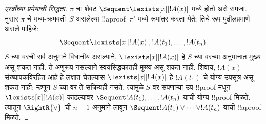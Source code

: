 \documentclass[../../../include/open-logic-section]{subfiles}
\begin{document}
\begin{proof}[एरब्राँच्या प्रमेयाची सिद्धता]
$\pi$ चा शेवट
$\Sequent \lexists[x][!A(x)]$
मध्ये होतो असे समजा.
 नुसार
$\pi$ चे मध्य-क्रमवर्ती~$S$
असलेल्या !!a{proof}~$\pi'$
मध्ये रूपांतर करता येते;
तिचे रूप पुढीलप्रमाणे असले
पाहिजे: \[\Sequent
\lexists[x][!A(x)], !A(t_1), \dots, !A(t_n).\]
$S$ च्या वरची सर्व
अनुमाने विधानीय असल्याने,
$\lexists[x][!A(x)]$
हे $S$ च्या वरच्या
अनुमानात मुख्य असू शकत नाही.
ते अणुरूप नसल्याने
स्वयंसिद्धकातही मुख्य
असू शकत नाही. शिवाय,
$!A(x)$ संख्यापकविरहित
आहे हे लक्षात घेतल्यास
$\lexists[x][!A(x)]$
हे $!A(t_1)$ चे
योग्य उपसूत्र असू शकत नाही;
म्हणून $S$ च्या वर
ते सक्रियही नसते.
त्यामुळे $S$ वर संपणाऱ्या
उप-!!{proof} मधून
$\lexists[x][!A(x)]$
काढल्यावर
$\Sequent !A(t_1), \dots, !A(t_n)$
याची योग्य !!{proof}
मिळते. त्यातून
$\RightR{\lor}$ ची
$n-1$ अनुमाने लावून
$\Sequent !A(t_1) \lor \dots \lor !A(t_n)$
याची !!a{proof} मिळते.
\end{proof}

\end{document}
